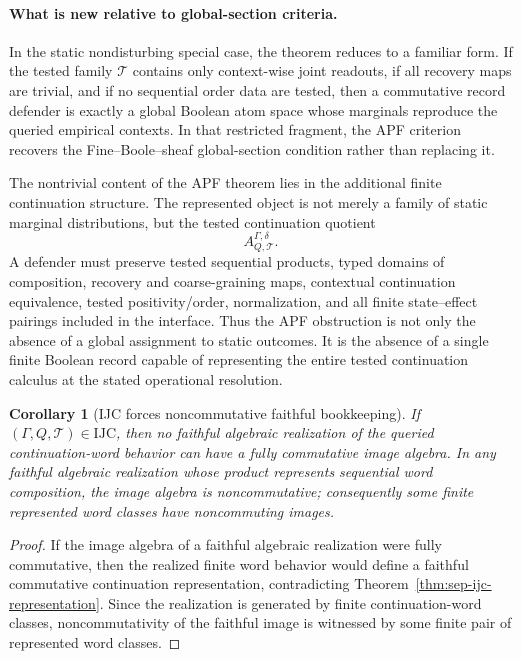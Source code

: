 \documentclass[11pt]{article}
\newtheorem{corollary}[theorem]{Corollary}
\newcommand{\IJC}{\mathrm{IJC}}
\begin{document}
\paragraph{What is new relative to global-section criteria.}
In the static nondisturbing special case, the theorem reduces to a
familiar form.  If the tested family $\mathcal T$ contains only
context-wise joint readouts, if all recovery maps are trivial, and if no
sequential order data are tested, then a commutative record defender is
exactly a global Boolean atom space whose marginals reproduce the
queried empirical contexts.  In that restricted fragment, the APF
criterion recovers the Fine--Boole--sheaf global-section condition
rather than replacing it.

The nontrivial content of the APF theorem lies in the additional finite
continuation structure.  The represented object is not merely a family
of static marginal distributions, but the tested continuation quotient
\[
    A^{\Gamma,\delta}_{Q,\mathcal T}.
\]
A defender must preserve tested sequential products, typed domains of
composition, recovery and coarse-graining maps, contextual continuation
equivalence, tested positivity/order, normalization, and all finite
state--effect pairings included in the interface.  Thus the APF
obstruction is not only the absence of a global assignment to static
outcomes.  It is the absence of a single finite Boolean record capable
of representing the entire tested continuation calculus at the stated
operational resolution.

\begin{corollary}[IJC forces noncommutative faithful bookkeeping]\label{cor:ijc-noncommutative}
If $(\Gamma,Q,\mathcal T)\in\IJC$, then no faithful algebraic realization of the queried continuation-word behavior can have a fully commutative image algebra.  In any faithful algebraic realization whose product represents sequential word composition, the image algebra is noncommutative; consequently some finite represented word classes have noncommuting images.
\end{corollary}
\begin{proof}
If the image algebra of a faithful algebraic realization were fully commutative, then the realized finite word behavior would define a faithful commutative continuation representation, contradicting Theorem~\ref{thm:sep-ijc-representation}.  Since the realization is generated by finite continuation-word classes, noncommutativity of the faithful image is witnessed by some finite pair of represented word classes.
\end{proof}
\end{document}
